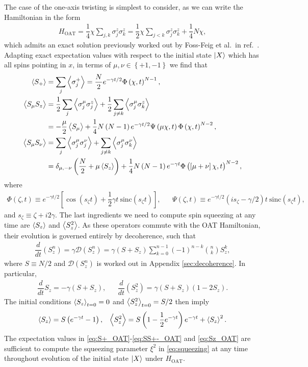 \documentclass[aps,notitlepage,nofootinbib,11pt]{revtex4-1}
\renewcommand{\t}{\text} %
\newcommand{\f}[2]{\dfrac{#1}{#2}} %
\newcommand{\p}[1]{\left(#1\right)} %
\renewcommand{\sp}[1]{\left[#1\right]} %
\renewcommand{\set}[1]{\left\{#1\right\}} %
\newcommand{\bk}{\Braket} %
\newcommand{\D}{\mathcal{D}}
\newcommand{\1}{\mathds{1}}
\begin{document}
The case of the one-axis twisting is simplest to consider, as we can
write the Hamiltonian in the form
\begin{align}
  H_{\t{OAT}} = \f14 \chi \sum_{j,k} \sigma_j^z \sigma_k^z
  = \f12 \chi \sum_{j<k} \sigma_j^z \sigma_k^z + \f14 N \chi,
\end{align}
which admits an exact solution previously worked out by Foss-Feig et
al.~in ref.~\cite{foss-feig2013nonequilibrium}.  Adapting exact
expectation values with respect to the initial state $\ket{X}$ which
has all spins pointing in $x$, in terms of $\mu,\nu\in\set{+1,-1}$ we
find that
\begin{align}
  \bk{S_+}
  &= \sum_j\bk{\sigma_j^+}
  = \f{N}{2} e^{-\gamma t/2} \Phi\p{\chi,t}^{N-1}, \label{eq:S+_OAT} \\
  \bk{S_\mu S_z}
  &= \f12\sum_j\bk{\sigma_j^\mu\sigma_j^z}
  + \f12\sum_{j\ne k} \bk{\sigma_j^\mu \sigma_k^z} \\
  &= -\f{\mu}{2}\bk{S_\mu} + \f14 N \p{N-1} e^{-\gamma t/2}
  \Psi\p{\mu\chi,t} \Phi\p{\chi,t}^{N-2}, \\
  \bk{S_\mu S_\nu}
  &= \sum_j \bk{\sigma_j^\mu \sigma_j^\nu}
  + \sum_{j\ne k} \bk{\sigma_j^\mu \sigma_k^\nu} \\
  &= \delta_{\mu,-\nu} \p{\f{N}{2} + \mu \bk{S_z}}
  + \f14 N \p{N-1} e^{-\gamma t}
  \Phi\p{\sp{\mu+\nu}\chi,t}^{N-2}, \label{eq:SS+-_OAT}
\end{align}
where
\begin{align}
  \Phi\p{\zeta,t} \equiv e^{-\gamma t/2}
  \sp{\cos\p{s_\zeta t}+\f12\gamma t~\t{sinc}\p{s_\zeta t}},
  &&
  \Psi\p{\zeta,t} \equiv e^{-\gamma t/2}
  \p{is_\zeta-\gamma/2}t~ \t{sinc}\p{s_\zeta t},
\end{align}
and $s_\zeta \equiv \zeta + i2\gamma$.  The last ingredients we need
to compute spin squeezing at any time are $\bk{S_z}$ and $\bk{S_z^2}$.
As these operators commute with the OAT Hamiltonian, their evolution
is governed entirely by decoherence, such that
\begin{align}
  \f{d}{dt}\p{S_z^n}
  = \gamma \D\p{S_z^n}
  = \gamma \p{S + S_z} \sum_{k=0}^{n-1}
  \p{-1}^{n-k} { n \choose k } S_z^k,
\end{align}
where $S\equiv N/2$ and $\D\p{S_z^n}$ is worked out in Appendix
\ref{sec:decoherence}.  In particular,
\begin{align}
  \f{d}{dt} S_z = -\gamma \p{S + S_z},
  &&
  \f{d}{dt}\p{S_z^2} = \gamma \p{S + S_z} \p{1 - 2S_z}.
\end{align}
The initial conditions $\bk{S_z}_{t=0}=0$ and $\bk{S_z^2}_{t=0}=S/2$
then imply
\begin{align}
  \bk{S_z} = S\p{e^{-\gamma t}-1},
  &&
  \bk{S_z^2} = S \p{1 - \f12 e^{-\gamma t}} e^{-\gamma t} + \bk{S_z}^2.
  \label{eq:Sz_OAT}
\end{align}
The expectation values in \eqref{eq:S+_OAT}-\eqref{eq:SS+-_OAT} and
\eqref{eq:Sz_OAT} are sufficient to compute the squeezing parameter
$\xi^2$ in \eqref{eq:squeezing} at any time throughout evolution of
the initial state $\ket{X}$ under $H_{\t{OAT}}$.
\end{document}
